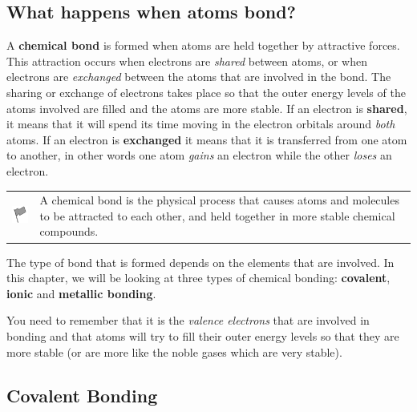             \subsection{ What happens when atoms bond?}
            \nopagebreak
      \label{m38704*id138842}A \textbf{chemical bond} is formed when atoms are held together by attractive forces. This attraction occurs when electrons are \textsl{shared} between atoms, or when electrons are \textsl{exchanged} between the atoms that are involved in the bond. The sharing or exchange of electrons takes place so that the outer energy levels of the atoms involved are filled and the atoms are more stable. If an electron is \textbf{shared}, it means that it will spend its time moving in the electron orbitals around \textsl{both} atoms. If an electron is \textbf{exchanged} it means that it is transferred from one atom to another, in other words one atom \textsl{gains} an electron while the other \textsl{loses} an electron.\par 
\label{m38704*fhsst!!!underscore!!!id83}\begin{definition}
	  \begin{tabular*}{15 cm}{m{15 mm}m{}}
	\hspace*{-50pt}  \includegraphics[width=0.5in]{col11305.imgs/psflag2.png}   & \Definition{   \label{id2427062}\textbf{ Chemical bond }} { \label{m38704*meaningfhsst!!!underscore!!!id83}
      A chemical bond is the physical process that causes atoms and molecules to be attracted to each other, and held together in more stable chemical compounds. 
       } 
      \end{tabular*}
      \end{definition}
      \label{m38704*id138909}The type of bond that is formed depends on the elements that are involved. In this chapter, we will be looking at three types of chemical bonding: \textbf{covalent}, \textbf{ionic} and \textbf{metallic bonding}.\par 
      \label{m38704*id138929}You need to remember that it is the \textsl{valence electrons} that are involved in bonding and that atoms will try to fill their outer energy levels so that they are more stable (or are more like the noble gases which are very stable).\par 
    \label{m38704*cid5}
            \subsection{ Covalent Bonding}
            \nopagebreak
            \label{m38704*uid6}

